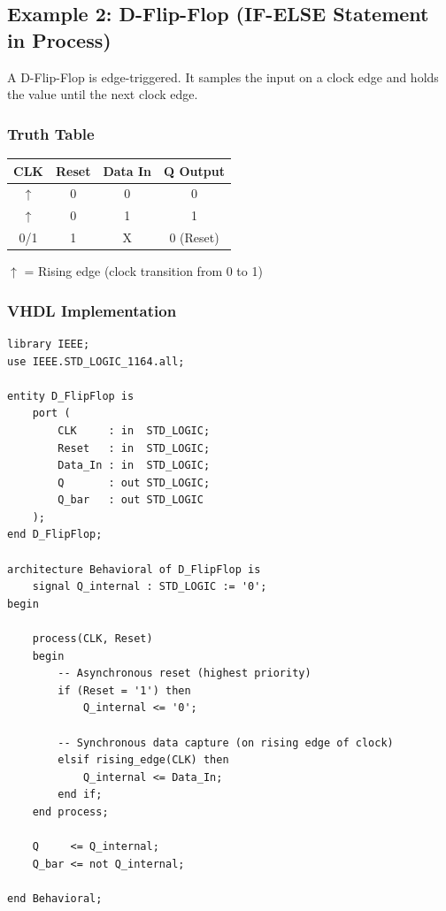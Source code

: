 \documentclass[12pt,a4paper]{article}
\begin{document}
\newpage

\subsection{Example 2: D-Flip-Flop (IF-ELSE Statement in Process)}

A D-Flip-Flop is edge-triggered. It samples the input on a clock edge and holds the value until the next clock edge.

\subsubsection{Truth Table}
\begin{table}[h]
\centering
\begin{tabular}{|c|c|c|c|}
\hline
\textbf{CLK} & \textbf{Reset} & \textbf{Data In} & \textbf{Q Output} \\
\hline
$\uparrow$ & 0 & 0 & 0 \\
\hline
$\uparrow$ & 0 & 1 & 1 \\
\hline
0/1 & 1 & X & 0 (Reset) \\
\hline
\end{tabular}

\begin{flushleft}
$\uparrow$ = Rising edge (clock transition from 0 to 1)
\end{flushleft}
\end{table}

\subsubsection{VHDL Implementation}

\begin{lstlisting}
library IEEE;
use IEEE.STD_LOGIC_1164.all;

entity D_FlipFlop is
    port (
        CLK     : in  STD_LOGIC;
        Reset   : in  STD_LOGIC;
        Data_In : in  STD_LOGIC;
        Q       : out STD_LOGIC;
        Q_bar   : out STD_LOGIC
    );
end D_FlipFlop;

architecture Behavioral of D_FlipFlop is
    signal Q_internal : STD_LOGIC := '0';
begin
    
    process(CLK, Reset)
    begin
        -- Asynchronous reset (highest priority)
        if (Reset = '1') then
            Q_internal <= '0';
            
        -- Synchronous data capture (on rising edge of clock)
        elsif rising_edge(CLK) then
            Q_internal <= Data_In;
        end if;
    end process;
    
    Q     <= Q_internal;
    Q_bar <= not Q_internal;
    
end Behavioral;
\end{lstlisting}
\end{document}
